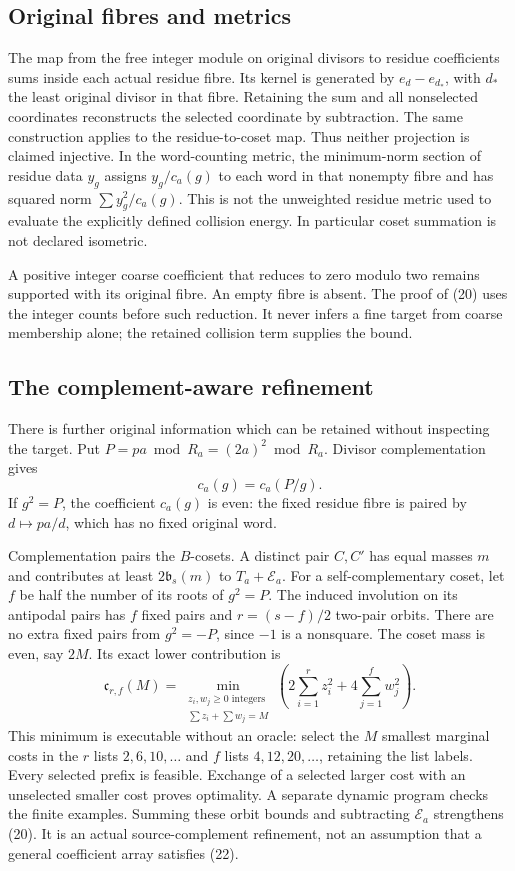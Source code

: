 \subsection{Original fibres and metrics}
The map from the free integer module on original divisors to residue coefficients
sums inside each actual residue fibre. Its kernel is generated by
$e_d-e_{d_*}$, with $d_*$ the least original divisor in that fibre. Retaining the
sum and all nonselected coordinates reconstructs the selected coordinate by
subtraction. The same construction applies to the residue-to-coset map.
Thus neither projection is claimed injective. In the word-counting metric, the
minimum-norm section of residue data $y_g$ assigns $y_g/c_a(g)$ to each word in
that nonempty fibre and has squared norm $\sum y_g^2/c_a(g)$. This is not the
unweighted residue metric used to evaluate the explicitly defined collision
energy. In particular coset summation is not declared isometric.

A positive integer coarse coefficient that reduces to zero modulo two remains
supported with its original fibre. An empty fibre is absent. The proof of (20)
uses the integer counts before such reduction. It never infers a fine target
from coarse membership alone; the retained collision term supplies the bound.

\subsection{The complement-aware refinement}
There is further original information which can be retained without inspecting
the target. Put $P=pa\bmod R_a=(2a)^2\bmod R_a$. Divisor complementation gives
\[
 c_a(g)=c_a(P/g).                                         \tag{22}
\]
If $g^2=P$, the coefficient $c_a(g)$ is even: the fixed residue fibre is paired
by $d\mapsto pa/d$, which has no fixed original word.

Complementation pairs the $B$-cosets. A distinct pair $C,C'$ has equal masses
$m$ and contributes at least $2\mathfrak b_s(m)$ to $T_a+\mathcal E_a$.
For a self-complementary coset, let $f$ be half the number of its roots of $g^2=P$.
The induced involution on its antipodal pairs has $f$ fixed pairs and
$r=(s-f)/2$ two-pair orbits. There are no extra fixed pairs from $g^2=-P$, since
$-1$ is a nonsquare. The coset mass is even, say $2M$. Its exact lower
contribution is
\[
 \mathfrak c_{r,f}(M)=
 \min_{\substack{z_i,w_j\ge0\text{ integers}\\\sum z_i+\sum w_j=M}}
 \left(2\sum_{i=1}^r z_i^2+4\sum_{j=1}^f w_j^2\right).   \tag{23}
\]
This minimum is executable without an oracle: select the $M$ smallest marginal
costs in the $r$ lists $2,6,10,\ldots$ and $f$ lists $4,12,20,\ldots$, retaining
the list labels. Every selected prefix is feasible. Exchange of a selected larger
cost with an unselected smaller cost proves optimality. A separate dynamic
program checks the finite examples. Summing these orbit bounds and subtracting
$\mathcal E_a$ strengthens (20). It is an actual source-complement refinement,
not an assumption that a general coefficient array satisfies (22).

